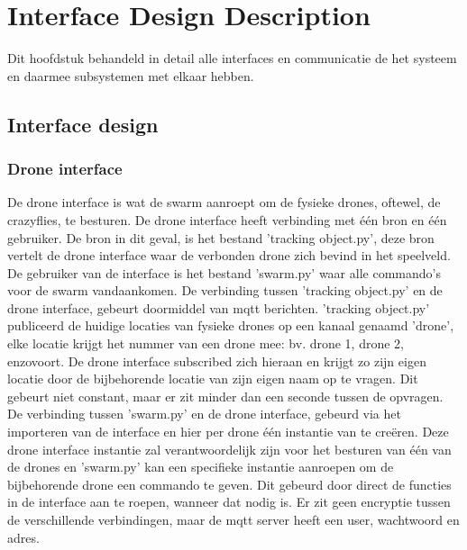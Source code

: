 \section{Interface Design Description}
Dit hoofdstuk behandeld in detail alle interfaces en communicatie de het systeem
en daarmee subsystemen met elkaar hebben.

\subsection{Interface design}
\subsubsection{Drone interface}
De drone interface is wat de swarm aanroept om de fysieke drones, oftewel, de crazyflies, te besturen. De drone interface heeft verbinding met één bron en één gebruiker. De bron in dit geval, is het bestand 'tracking object.py', deze bron vertelt de drone interface waar de verbonden drone zich bevind in het speelveld. De gebruiker van de interface is het bestand 'swarm.py' waar alle commando's voor de swarm vandaankomen.
De verbinding tussen 'tracking object.py' en de drone interface, gebeurt doormiddel van mqtt berichten. 'tracking object.py' publiceerd de huidige locaties van fysieke drones op een kanaal genaamd 'drone', elke locatie krijgt het nummer van een drone mee: bv. drone 1, drone 2, enzovoort. De drone interface subscribed zich hieraan en krijgt zo zijn eigen locatie door de bijbehorende locatie van zijn eigen naam op te vragen. Dit gebeurt niet constant, maar er zit minder dan een seconde tussen de opvragen. 
De verbinding tussen 'swarm.py' en de drone interface, gebeurd via het importeren van de interface en hier per drone één instantie van te creëren. Deze drone interface instantie zal verantwoordelijk zijn voor het besturen van één van de drones en 'swarm.py' kan een specifieke instantie aanroepen om de bijbehorende drone een commando te geven. Dit gebeurd door direct de functies in de interface aan te roepen, wanneer dat nodig is. Er zit geen encryptie tussen de verschillende verbindingen, maar de mqtt server heeft een user, wachtwoord en adres.
